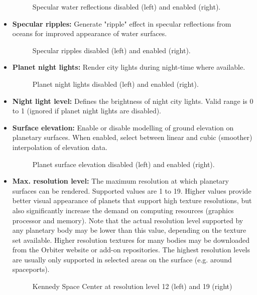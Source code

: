 \documentclass[Orbiter User Manual.tex]{subfiles}
\begin{document}
\begin{itemize}
\begin{figure}[H]
	\centering
	\caption{Specular water reflections disabled (left) and enabled (right).}
\end{figure}

\item \textbf{Specular ripples:} Generate "ripple" effect in specular reflections from oceans for improved appearance of water surfaces.

\begin{figure}[H]
	\centering
	\caption{Specular ripples disabled (left) and enabled (right).}
\end{figure}

\item \textbf{Planet night lights:} Render city lights during night-time where available.

\begin{figure}[H]
	\centering
	\caption{Planet night lights disabled (left) and enabled (right).}
\end{figure}

\item \textbf{Night light level:} Defines the brightness of night city lights. Valid range is 0 to 1 (ignored if planet night lights are disabled).
\item \textbf{Surface elevation:} Enable or disable modelling of ground elevation on planetary surfaces. When enabled, select between linear and cubic (smoother) interpolation of elevation data.

\begin{figure}[H]
	\centering
	\caption{Planet surface elevation disabled (left) and enabled (right).}
\end{figure}

\item \textbf{Max. resolution level:} The maximum resolution at which planetary surfaces can be rendered. Supported values are 1 to 19. Higher values provide better visual appearance of planets that support high texture resolutions, but also significantly increase the demand on computing resources (graphics processor and memory). Note that the actual resolution level supported by any planetary body may be lower than this value, depending on the texture set available. Higher resolution textures for many bodies may be downloaded from the Orbiter website or add-on repositories. The highest resolution levels are usually only supported in selected areas on the surface (e.g. around spaceports).

\begin{figure}[H]
	\centering
	\caption{Kennedy Space Center at resolution level 12 (left) and 19 (right)}
\end{figure}

\end{itemize}
\end{document}
